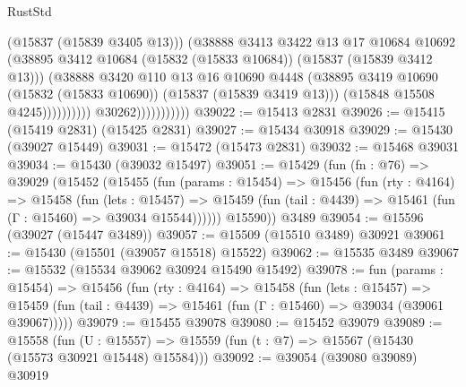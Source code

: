 \begin{lexlean}{RustStd}
\begin{coremodule}
{\begin{coremodule}
{{{{{{{{{{{{{{{{{{{{{{{{{{{{{{{{{{{{{{{{{{{{{{{{{{{{{{{{{{{{                                          (@15837 (@15839 @3405 @13)))
                                        (@38888
                                          @3413
                                          @3422
                                          @13
                                          @17
                                          @10684
                                          @10692
                                          (@38895
                                            @3412
                                            @10684
                                            (@15832 (@15833 @10684))
                                            (@15837 (@15839 @3412 @13)))
                                          (@38888
                                            @3420
                                            @110
                                            @13
                                            @16
                                            @10690
                                            @4448
                                            (@38895
                                              @3419
                                              @10690
                                              (@15832 (@15833 @10690))
                                              (@15837 (@15839 @3419 @13)))
                                            (@15848 @15508 @4245))))))))))
                          @30262)))))))))))
@39022 := @15413 @2831
@39026 := @15415 (@15419 @2831) (@15425 @2831)
@39027 := @15434 @30918
@39029 := @15430 (@39027 @15449)
@39031 := @15472 (@15473 @2831)
@39032 := @15468 @39031
@39034 := @15430 (@39032 @15497)
@39051 := @15429
    (fun (fn : @76) =>
    @39029
      (@15452
        (@15455
          (fun (params : @15454) =>
          @15456
            (fun (rty : @4164) =>
            @15458
              (fun (lets : @15457) =>
              @15459 (fun (tail : @4439) => @15461 (fun (Γ : @15460) => @39034 @15544))))))
        @15590))
    @3489
@39054 := @15596 (@39027 (@15447 @3489))
@39057 := @15509 (@15510 @3489) @30921
@39061 := @15430 (@15501 (@39057 @15518) @15522)
@39062 := @15535 @3489
@39067 := @15532 (@15534 @39062 @30924 @15490 @15492)
@39078 := fun (params : @15454) =>
  @15456
    (fun (rty : @4164) =>
    @15458
      (fun (lets : @15457) =>
      @15459 (fun (tail : @4439) => @15461 (fun (Γ : @15460) => @39034 (@39061 @39067)))))
@39079 := @15455 @39078
@39080 := @15452 @39079
@39089 := @15558
    (fun (U : @15557) => @15559 (fun (t : @7) => @15567 (@15430 (@15573 @30921 @15448) @15584)))
@39092 := @39054 (@39080 @39089) @30919
}}}}}}}}}}}}}}}}}}}}}}}}}}}}}}}}}}}}}}}}}}}}}}}}}}}}}}}}}}}}
\end{coremodule}}
\end{coremodule}
\end{lexlean}
